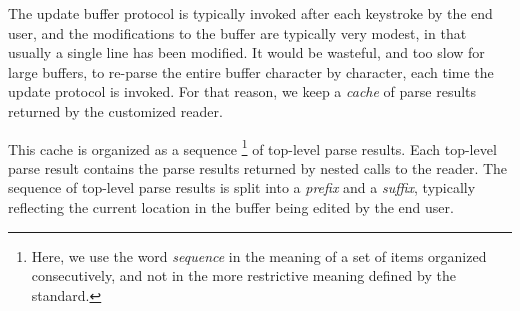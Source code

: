 The update buffer protocol is typically invoked after each keystroke
by the end user, and the modifications to the buffer are typically
very modest, in that usually a single line has been modified.  It
would be wasteful, and too slow for large buffers, to re-parse the
entire buffer character by character, each time the update protocol is
invoked.  For that reason, we keep a \emph{cache} of parse results
returned by the customized reader.

This cache is organized as a sequence%
\footnote{Here, we use the word \emph{sequence} in the meaning of a
  set of items organized consecutively, and not in the more
  restrictive meaning defined by the \commonlisp{} standard.}
of top-level parse results.  Each top-level parse result contains the
parse results returned by nested calls to the reader.  The sequence of
top-level parse results is split into a \emph{prefix} and a
\emph{suffix}, typically reflecting the current location in the buffer
being edited by the end user.
